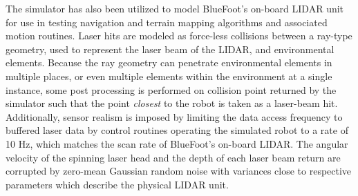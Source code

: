 	The simulator has also been utilized to model BlueFoot's on-board LIDAR unit for use in testing navigation and terrain mapping algorithms and associated motion routines. Laser hits are modeled as force-less collisions between a ray-type geometry, used to represent the laser beam of the LIDAR, and environmental elements. Because the ray geometry can penetrate environmental elements in multiple places, or even multiple elements within the environment at a single instance, some post processing is performed on collision point returned by the simulator such that the point \emph{closest} to the robot is taken as a laser-beam hit. Additionally, sensor realism is imposed by limiting the data access frequency to buffered laser data by control routines operating the simulated robot to a rate of 10 Hz, which matches the scan rate of BlueFoot's on-board LIDAR. The angular velocity of the spinning laser head and the depth of each laser beam return are corrupted by zero-mean Gaussian random noise with variances close to respective parameters which describe the physical LIDAR unit.
